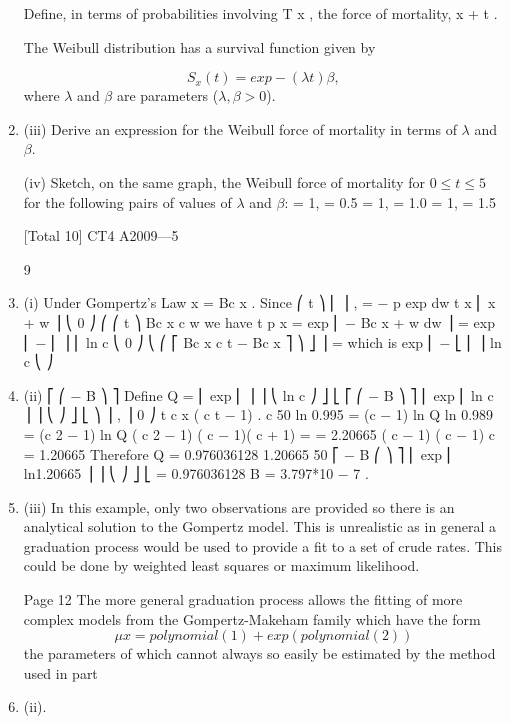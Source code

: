 \documentclass[a4paper,12pt]{article}
\begin{document}
\begin{enumerate}
Define, in terms of probabilities involving T x , the force of mortality, \mu x + t .

The Weibull distribution has a survival function given by

\[
S_x(t) = exp − ( \lambda t ) \beta ,
\]
where $\lambda$ and $\beta$ are parameters ($\lambda, \beta > 0$).
\item (iii)
Derive an expression for the Weibull force of mortality in terms of $\lambda$ and $\beta$.

(iv)
Sketch, on the same graph, the Weibull force of mortality for $0 \leq t \leq 5$ for the
following pairs of values of $\lambda$ and $\beta$:
\lambda = 1, \beta = 0.5
\lambda = 1, \beta = 1.0
\lambda = 1, \beta = 1.5

[Total 10]
CT4 A2009—5



9
\item (i)
Under Gompertz’s Law
\mu x = Bc x .
Since
⎛ t
⎞
⎜
⎟ ,
=
−
\mu
p
exp
dw
t x
⎜ \int x + w ⎟
⎝ 0
⎠
⎛
⎛ t
⎞
Bc x c w
we have t p x = exp ⎜ − \int Bc x + w dw ⎟ = exp ⎜ −
⎜
⎟
⎜
ln c
⎝ 0
⎠
⎝
⎛ ⎡ Bc x c t − Bc x ⎤ ⎞
⎦ ⎟ =
which is exp ⎜ − ⎣
⎜
⎟
ln c
⎝
⎠
\item (ii)
⎡
⎛ − B ⎞ ⎤
Define Q = ⎢ exp ⎜
⎟ ⎥
⎝ ln c ⎠ ⎦
⎣
⎡
⎛ − B ⎞ ⎤
⎢ exp ⎜ ln c ⎟ ⎥
⎝
⎠ ⎦
⎣
⎞
⎟ ,
⎟
0 ⎠
t
c x ( c t − 1)
.
c 50
ln 0.995 = (c − 1) ln Q
ln 0.989 = (c 2 − 1) ln Q
( c 2 − 1) ( c − 1)( c + 1)
=
= 2.20665
( c − 1)
( c − 1)
c = 1.20665
Therefore Q = 0.976036128
1.20665 50
⎡
− B
⎛
⎞ ⎤
⎢ exp ⎜ ln1.20665 ⎟ ⎥
⎝
⎠ ⎦
⎣
= 0.976036128
B = 3.797*10 − 7 .
\item (iii)
In this example, only two observations are provided so there is an analytical solution to the Gompertz model.
This is unrealistic as in general a graduation process would be used to provide a fit to a set of crude rates.
This could be done by weighted least squares or maximum likelihood.

\newpage
Page 12%
The more general graduation process allows the fitting of more complex
models from the Gompertz-Makeham family which have the form
\[\mu x = polynomial(1) + exp(polynomial(2))\]
the parameters of which cannot always so easily be estimated by the method
used in part \item (ii).


\end{enumerate}
\end{document}
